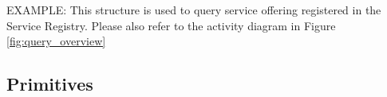 \documentclass[a4paper]{arrowhead}
\newcommand{\pref}[1]{{\textcolor{ArrowheadGrey}{\hyperref[sec:model:primitives:#1]{#1}}}}
\begin{document}


\color{red} 


EXAMPLE: This structure is used to query service offering registered in
the Service Registry. Please also refer to the activity diagram in
Figure \ref{fig:query_overview} \color{black}



\subsection{Primitives}
\label{sec:model:primitives}
\end{document}
